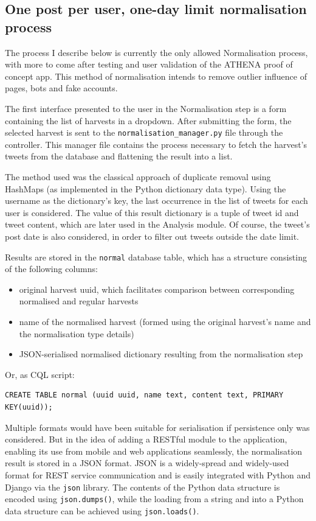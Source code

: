 \documentclass[12pt,a4paper,twoside]{report}
\begin{document}
\subsection{One post per user, one-day limit normalisation process}
The process I describe below is currently the only allowed Normalisation process, with more to come after testing and user validation of the ATHENA proof of concept app. This method of normalisation intends to remove outlier influence of pages, bots and fake accounts.

The first interface presented to the user in the Normalisation step is a form containing the list of harvests in a dropdown. After submitting the form, the selected harvest is sent to the \texttt{normalisation\_manager.py} file through the controller. This manager file contains the process necessary to fetch the harvest's tweets from the database and flattening the result into a list.

The method used was the classical approach of duplicate removal using HashMaps (as implemented in the Python dictionary data type). Using the username as the dictionary's key, the last occurrence in the list of tweets for each user is considered. The value of this result dictionary is a tuple of tweet id and tweet content, which are later used in the Analysis module. Of course, the tweet's post date is also considered, in order to filter out tweets outside the date limit.

Results are stored in the \texttt{normal} database table, which has a structure consisting of the following columns:
\begin{itemize}
\item original harvest uuid, which facilitates comparison between corresponding normalised and regular harvests
\item name of the normalised harvest (formed using the original harvest's name and the normalisation type details)
\item JSON-serialised normalised dictionary resulting from the normalisation step
\end{itemize}

Or, as CQL script:
\begin{lstlisting}
CREATE TABLE normal (uuid uuid, name text, content text, PRIMARY KEY(uuid));
\end{lstlisting}

Multiple formats would have been suitable for serialisation if persistence only was considered. But in the idea of adding a RESTful module to the application, enabling its use from mobile and web applications seamlessly, the normalisation result is stored in a JSON format. JSON is a widely-spread and widely-used format for REST service communication and is easily integrated with Python and Django via the \texttt{json} library. The contents of the Python data structure is encoded using \texttt{json.dumps()}, while the loading from a string and into a Python data structure can be achieved using \texttt{json.loads()}.
\end{document}
